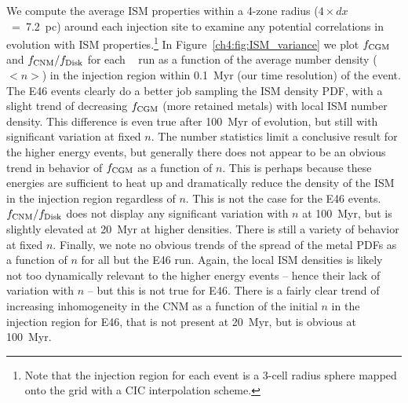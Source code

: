We compute the average ISM properties within a 4-zone radius ($4 \times dx$~=~7.2~pc) around each injection site to examine any potential correlations in evolution with ISM properties.\footnote{Note that the injection region for each event is a 3-cell radius sphere mapped onto the grid with a CIC interpolation scheme.} In Figure~\ref{ch4:fig:ISM_variance} we plot $f_{\rm CGM}$ and $f_{\rm CNM} / f_{\rm Disk}$ for each \runonenu~ run as a function of the average number density ($<n>$) in the injection region within 0.1~Myr (our time resolution) of the event. The E46 events clearly do a better job sampling the ISM density PDF, with a slight trend of decreasing $f_{\rm CGM}$ (more retained metals) with local ISM number density. This difference is even true after 100~Myr of evolution, but still with significant variation at fixed $n$. The number statistics limit a conclusive result for the higher energy events, but generally there does not appear to be an obvious trend in behavior of $f_{\rm CGM}$ as a function of $n$. This is perhaps because these energies are sufficient to heat up and dramatically reduce the density of the ISM in the injection region regardless of $n$. This is not the case for the E46 events. $f_{\rm CNM} / f_{\rm Disk}$ does not display any significant variation with $n$ at 100~Myr, but is slightly elevated at 20~Myr at higher densities. There is still a variety of behavior at fixed $n$. Finally, we note no obvious trends of the spread of the metal PDFs as a function of $n$ for all but the E46 run. Again, the local ISM densities is likely not too dynamically relevant to the higher energy events -- hence their lack of variation with $n$ -- but this is not true for E46. There is a fairly clear trend of increasing inhomogeneity in the CNM as a function of the initial $n$ in the injection region for E46, that is not present at 20~Myr, but is obvious at 100~Myr.

